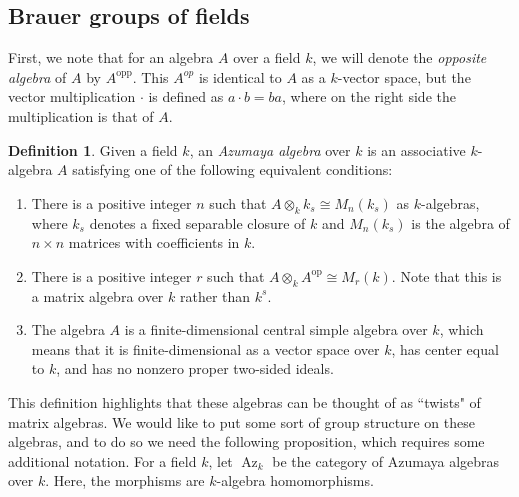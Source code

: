 \documentclass[12pt,twoside]{reedthesis}
\theoremstyle{plain}
\theoremstyle{definition}
\newtheorem{definition}{Definition}[section]
\theoremstyle{remark}
\newcommand{\Az}{\operatorname{Az}}
\begin{document}
\subsection{Brauer groups of fields}
First, we note that for an algebra $A$ over a field $k$, we will denote the \emph{opposite algebra} of $A$ by $A^{\text{opp}}$. This $A^{op}$ is identical to $A$ as a $k$-vector space, but the vector multiplication $\cdot$ is defined as $a\cdot b=ba$, where on the right side the multiplication is that of $A$.
\begin{definition}
Given a field $k$, an \emph{Azumaya algebra} over $k$ is an associative $k$-algebra $A$ satisfying one of the following equivalent conditions:
\begin{enumerate}
\item There is a positive integer $n$ such that $A\otimes_k k_s\cong M_n(k_s)$ as $k$-algebras, where $k_s$ denotes a fixed separable closure of $k$ and $M_n(k_s)$ is the algebra of $n\times n$ matrices with coefficients in $k$.
\item There is a positive integer $r$ such that $A\otimes_k A^{\text{op}}\cong M_r(k)$. Note that this is a matrix algebra over $k$ rather than $k^s$.
\item The algebra $A$ is a finite-dimensional central simple algebra over $k$, which means that it is finite-dimensional as a vector space over $k$, has center equal to $k$, and has no nonzero proper two-sided ideals.
\end{enumerate}
\end{definition}
\noindent This definition highlights that these algebras can be thought of as ``twists" of matrix algebras.
We would like to put some sort of group structure on these algebras, and to do so we need the following proposition, which requires some additional notation. For a field $k$, let $\Az_k$ be the category of Azumaya algebras over $k$. Here, the morphisms are $k$-algebra homomorphisms.
\end{document}
